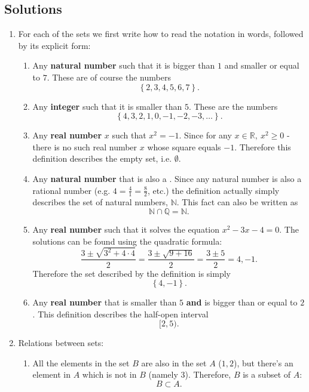 \subsection{Solutions}
\begin{enumerate}
	\item For each of the sets we first write how to read the notation in words, followed by its explicit form:
		\begin{enumerate}[label={(\roman*)}]
			\item Any \textbf{natural number} such that it is bigger than $1$ and smaller or equal to $7$. These are of course the numbers
				\[
					\left\{2,3,4,5,6,7\right\}.
				\]

			\item Any \textbf{integer} such that it is smaller than $5$. These are the numbers
				\[
					\left\{4,3,2,1,0,-1,-2,-3,\dots\right\}.
				\]

			\item Any \textbf{real number} $x$ such that $x^{2}=-1$. Since for any $x\in\mathbb{R},\ x^{2}\geq0$ - there is no such real number $x$ whose square equals $-1$. Therefore this definition describes the empty set, i.e. $\emptyset$.

			\item Any \textbf{natural number} that is also a . Since any natural number is also a rational number (e.g. $4=\frac{4}{1}=\frac{8}{2}$, etc.) the definition actually simply describes the set of natural numbers, $\mathbb{N}$. This fact can also be written as
				\[
					\mathbb{N} \cap \mathbb{Q} = \mathbb{N}.
				\]

			\item Any \textbf{real number} such that it solves the equation $x^{2}-3x-4=0$. The solutions can be found using the quadratic formula:
				\[
					\frac{3\pm\sqrt{3^{2}+4\cdot4}}{2} = \frac{3\pm\sqrt{9+16}}{2} = \frac{3\pm5}{2} = 4,-1.
				\]
				Therefore the set described by the definition is simply
				\[
					\left\{4,-1\right\}.
				\]

			\item Any \textbf{real number} that is smaller than $5$ \textbf{and} is bigger than or equal to $2$. This definition describes the half-open interval
				\[
					[2,5).
				\]
		\end{enumerate}

	\item Relations between sets:
		\begin{enumerate}[label={(\roman*)}]
			\item All the elements in the set $B$ are also in the set $A$ ($1,2$), but there's an element in $A$ which is not in $B$ (namely $3$). Therefore, $B$ is a subset of $A$:
				\[
					B\subset A.
				\]


\end{enumerate}
\end{enumerate}
